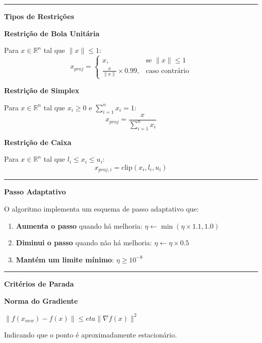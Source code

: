 \documentclass[12pt,a4paper]{article}
\begin{document}
\vspace{0.5cm}\hrule\vspace{0.5cm}\textbf{Tipos de Restrições}

\textbf{Restrição de Bola Unitária}

Para $x \in \mathbb{R}^n$ tal que $\|x\| \leq 1$:
\begin{equation}
x_{proj} = \begin{cases}
x, & \text{se } \|x\| \leq 1 \\
\frac{x}{\|x\|} \times 0.99, & \text{caso contrário}
\end{cases}
\end{equation}

\textbf{Restrição de Simplex}

Para $x \in \mathbb{R}^n$ tal que $x_i \geq 0$ e $\sum_{i=1}^n x_i = 1$:
\begin{equation}
x_{proj} = \frac{x}{\sum_{i=1}^n x_i}
\end{equation}

\textbf{Restrição de Caixa}

Para $x \in \mathbb{R}^n$ tal que $l_i \leq x_i \leq u_i$:
\begin{equation}
x_{proj,i} = \text{clip}(x_i, l_i, u_i)
\end{equation}

\vspace{0.5cm}\hrule\vspace{0.5cm}\textbf{Passo Adaptativo}

O algoritmo implementa um esquema de passo adaptativo que:

\begin{enumerate}
\item \textbf{Aumenta o passo} quando há melhoria: $\eta \leftarrow \min(\eta \times 1.1, 1.0)$
\item \textbf{Diminui o passo} quando não há melhoria: $\eta \leftarrow \eta \times 0.5$
\item \textbf{Mantém um limite mínimo}: $\eta \geq 10^{-8}$
\end{enumerate}

\vspace{0.5cm}\hrule\vspace{0.5cm}\textbf{Critérios de Parada}

\textbf{Norma do Gradiente}

 $\|f(x_{new}) - f(x)\| \leq  eta \|\nabla f(x)\|^2 $
 
Indicando que o ponto é aproximadamente estacionário.
\end{document}
